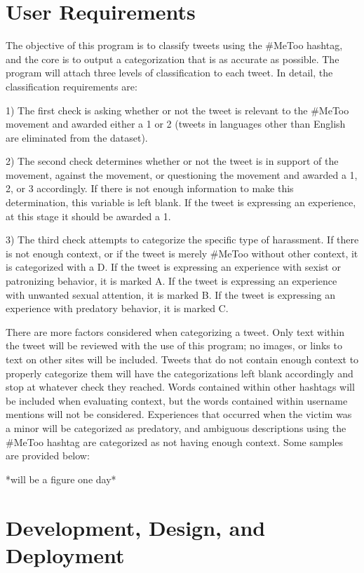\section{User Requirements}

The objective of this program is to classify tweets using the \#MeToo hashtag, and the core is to output a categorization that is as accurate as possible. The program will attach three levels of classification to each tweet. In detail, the classification requirements are:

1)  The first check is asking whether or not the tweet is relevant to the \#MeToo movement and awarded either a 1 or 2 (tweets in languages other than English are eliminated from the dataset).

2) The second check determines whether or not the tweet is in support of the movement, against the movement, or questioning the movement and awarded a 1, 2, or 3 accordingly. If there is not enough information to make this determination, this variable is left blank. If the tweet is expressing an experience, at this stage it should be awarded a 1.

3) The third check attempts to categorize the specific type of harassment. If there is not enough context, or if the tweet is merely \#MeToo without other context, it is categorized with a D. If the tweet is expressing an experience with sexist or patronizing behavior, it is marked A. If the tweet is expressing an experience with unwanted sexual attention, it is marked B. If the tweet is expressing an experience with predatory behavior, it is marked C.

There are more factors considered when categorizing a tweet. Only text within the tweet will be reviewed with the use of this program; no images, or links to text on other sites will be included. Tweets that do not contain enough context to properly categorize them will have the categorizations left blank accordingly and stop at whatever check they reached. Words contained within other hashtags will be included when evaluating context, but the words contained within username mentions will not be considered. Experiences that occurred when the victim was a minor will be categorized as predatory, and ambiguous descriptions using the \#MeToo hashtag are categorized as not having enough context. Some samples are provided below:

*will be a figure one day*

\section{Development, Design, and Deployment}

